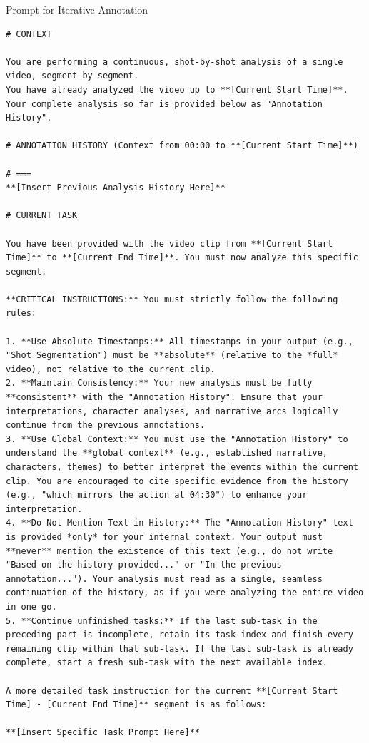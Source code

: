 \documentclass{llmxive}
\begin{document}
\begin{promptbox}{Prompt for Iterative Annotation}
\begin{lstlisting}
# CONTEXT

You are performing a continuous, shot-by-shot analysis of a single video, segment by segment.
You have already analyzed the video up to **[Current Start Time]**. Your complete analysis so far is provided below as "Annotation History".

# ANNOTATION HISTORY (Context from 00:00 to **[Current Start Time]**)

# ===
**[Insert Previous Analysis History Here]**

# CURRENT TASK

You have been provided with the video clip from **[Current Start Time]** to **[Current End Time]**. You must now analyze this specific segment.

**CRITICAL INSTRUCTIONS:** You must strictly follow the following rules:

1. **Use Absolute Timestamps:** All timestamps in your output (e.g., "Shot Segmentation") must be **absolute** (relative to the *full* video), not relative to the current clip.
2. **Maintain Consistency:** Your new analysis must be fully **consistent** with the "Annotation History". Ensure that your interpretations, character analyses, and narrative arcs logically continue from the previous annotations.
3. **Use Global Context:** You must use the "Annotation History" to understand the **global context** (e.g., established narrative, characters, themes) to better interpret the events within the current clip. You are encouraged to cite specific evidence from the history (e.g., "which mirrors the action at 04:30") to enhance your interpretation.
4. **Do Not Mention Text in History:** The "Annotation History" text is provided *only* for your internal context. Your output must **never** mention the existence of this text (e.g., do not write "Based on the history provided..." or "In the previous annotation..."). Your analysis must read as a single, seamless continuation of the history, as if you were analyzing the entire video in one go.
5. **Continue unfinished tasks:** If the last sub-task in the preceding part is incomplete, retain its task index and finish every remaining clip within that sub-task. If the last sub-task is already complete, start a fresh sub-task with the next available index.

A more detailed task instruction for the current **[Current Start Time] - [Current End Time]** segment is as follows:

**[Insert Specific Task Prompt Here]**
\end{lstlisting}
\end{promptbox}
\end{document}

